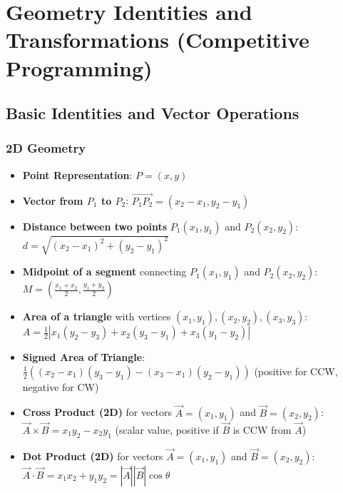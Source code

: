 \section*{Geometry Identities and Transformations (Competitive Programming)}

\subsection*{Basic Identities and Vector Operations}

\subsubsection*{2D Geometry}
\begin{itemize}
    \item \textbf{Point Representation}: $P=(x, y)$
    \item \textbf{Vector from $P_1$ to $P_2$}: $\vec{P_1P_2} = (x_2-x_1, y_2-y_1)$
    \item \textbf{Distance between two points} $P_1(x_1, y_1)$ and $P_2(x_2, y_2)$:
    $d = \sqrt{(x_2 - x_1)^2 + (y_2 - y_1)^2}$
    \item \textbf{Midpoint of a segment} connecting $P_1(x_1, y_1)$ and $P_2(x_2, y_2)$:
    $M = \left(\frac{x_1 + x_2}{2}, \frac{y_1 + y_2}{2}\right)$
    \item \textbf{Area of a triangle} with vertices $(x_1, y_1), (x_2, y_2), (x_3, y_3)$:
    $A = \frac{1}{2} |x_1(y_2 - y_3) + x_2(y_3 - y_1) + x_3(y_1 - y_2)|$
    \item \textbf{Signed Area of Triangle}: $\frac{1}{2}((x_2-x_1)(y_3-y_1) - (x_3-x_1)(y_2-y_1))$ (positive for CCW, negative for CW)
    \item \textbf{Cross Product (2D)} for vectors $\vec{A}=(x_1, y_1)$ and $\vec{B}=(x_2, y_2)$:
    $\vec{A} \times \vec{B} = x_1 y_2 - x_2 y_1$ (scalar value, positive if $\vec{B}$ is CCW from $\vec{A}$)
    \item \textbf{Dot Product (2D)} for vectors $\vec{A}=(x_1, y_1)$ and $\vec{B}=(x_2, y_2)$:
    $\vec{A} \cdot \vec{B} = x_1 x_2 + y_1 y_2 = |\vec{A}||\vec{B}|\cos\theta$
\end{itemize}

